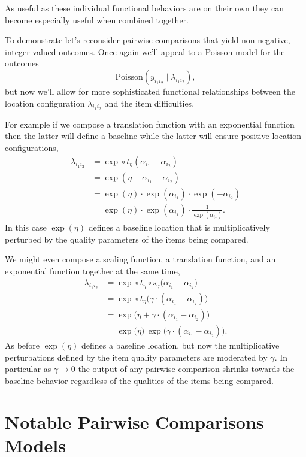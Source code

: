 \documentclass[
  letterpaper,
  DIV=11,
  numbers=noendperiod]{scrartcl}
\begin{document}
As useful as these individual functional behaviors are on their own they
can become especially useful when combined together.

To demonstrate let's reconsider pairwise comparisons that yield
non-negative, integer-valued outcomes. Once again we'll appeal to a
Poisson model for the outcomes \[
\text{Poisson}(y_{i_{1} i_{2}} \mid \lambda_{i_{1} i_{2}} ),
\] but now we'll allow for more sophisticated functional relationships
between the location configuration \(\lambda_{i_{1} i_{2}}\) and the
item difficulties.

For example if we compose a translation function with an exponential
function then the latter will define a baseline while the latter will
ensure positive location configurations, \begin{align*}
\lambda_{i_{1} i_{2}}
&=
\exp \circ t_{\eta}(\alpha_{i_{1}} - \alpha_{i_{2}})
\\
&=
\exp(\eta + \alpha_{i_{1}} - \alpha_{i_{2}})
\\
&=
\exp(\eta) \cdot \exp(\alpha_{i_{1}}) \cdot \exp(-\alpha_{i_{2}})
\\
&=
\exp(\eta)
\cdot \exp(\alpha_{i_{1}})
\cdot \frac{1}{\exp(\alpha_{i_{2}})}.
\end{align*} In this case \(\exp(\eta)\) defines a baseline location
that is multiplicatively perturbed by the quality parameters of the
items being compared.

We might even compose a scaling function, a translation function, and an
exponential function together at the same time, \begin{align*}
\lambda_{i_{1} i_{2}}
&=
\exp \circ t_{\eta} \circ s_{\gamma}
\big(\alpha_{i_{1}} - \alpha_{i_{2}}\big)
\\
&=
\exp \circ t_{\eta}
\big( \gamma \cdot (\alpha_{i_{1}} - \alpha_{i_{2}}) \big)
\\
&=
\exp \big( \eta + \gamma \cdot (\alpha_{i_{1}} - \alpha_{i_{2}}) \big)
\\
&=
\exp \big( \eta \big) \,
\exp \big( \gamma \cdot (\alpha_{i_{1}} - \alpha_{i_{2}}) \big).
\end{align*} As before \(\exp(\eta)\) defines a baseline location, but
now the multiplicative perturbations defined by the item quality
parameters are moderated by \(\gamma\). In particular as
\(\gamma \rightarrow 0\) the output of any pairwise comparison shrinks
towards the baseline behavior regardless of the qualities of the items
being compared.

\section{Notable Pairwise Comparisons
Models}\label{notable-pairwise-comparisons-models}
\end{document}
